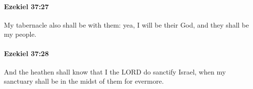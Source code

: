 		\paragraph{Ezekiel 37:27} %
			\label{EZEKIEL-37-27}

			My tabernacle also shall be with them: yea, I will be their God, and they shall be my people.


		\paragraph{Ezekiel 37:28} %
			\label{EZEKIEL-37-28}

			And the heathen shall know that I the LORD do sanctify Israel, when my sanctuary shall be in the midst of them for evermore.

